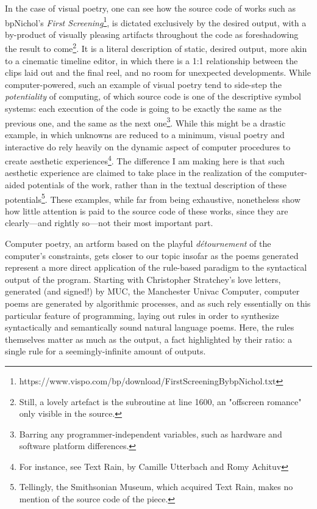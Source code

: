 \documentclass{article}
\begin{document}
In the case of visual poetry, one can see how the source code of works such as bpNichol's \emph{First Screening}\footnote{https://www.vispo.com/bp/download/FirstScreeningBybpNichol.txt}, is dictated exclusively by the desired output, with a by-product of visually pleasing artifacts throughout the code as foreshadowing the result to come\footnote{Still, a lovely artefact is the subroutine at line 1600, an "offscreen romance" only visible in the source.}. It is a literal description of static, desired output, more akin to a cinematic timeline editor, in which there is a 1:1 relationship between the clips laid out and the final reel, and no room for unexpected developments. While computer-powered, such an example of visual poetry tend to side-step the \emph{potentiality} of computing, of which source code is one of the descriptive symbol systems: each execution of the code is going to be exactly the same as the previous one, and the same as the next one\footnote{Barring any programmer-independent variables, such as hardware and software platform differences.}. While this might be a drastic example, in which unknowns are reduced to a minimum, visual poetry and interactive do rely heavily on the dynamic aspect of computer procedures to create aesthetic experiences\footnote{For instance, see Text Rain, by Camille Utterbach and Romy Achituv}. The difference I am making here is that such aesthetic experience are claimed to take place in the realization of the computer-aided potentials of the work, rather than in the textual description of these potentials\footnote{Tellingly, the Smithsonian Museum, which acquired Text Rain, makes no mention of the source code of the piece.}. These examples, while far from being exhaustive, nonetheless show how little attention is paid to the source code of these works, since they are clearly—and rightly so—not their most important part.

Computer poetry, an artform based on the playful \emph{détournement} of the computer's constraints, gets closer to our topic insofar as the poems generated represent a more direct application of the rule-based paradigm to the syntactical output of the program. Starting with Christopher Stratchey's love letters, generated (and signed!) by MUC, the Manchester Univac Computer, computer poems are generated by algorithmic processes, and as such rely essentially on this particular feature of programming, laying out rules in order to synthesize syntactically and semantically sound natural language poems. Here, the rules themselves matter as much as the output, a fact highlighted by their ratio: a single rule for a seemingly-infinite amount of outputs.
\end{document}
